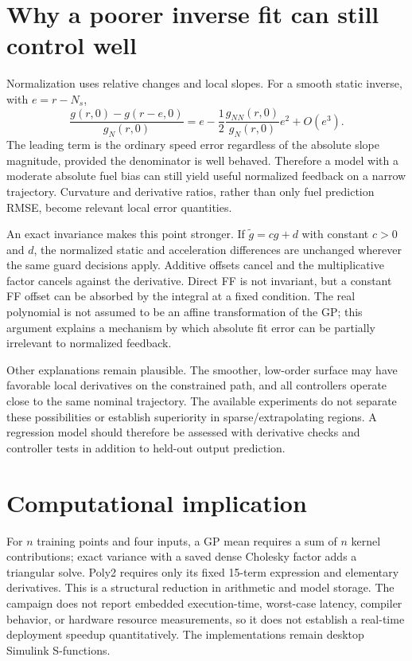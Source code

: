 \documentclass[11pt,a4paper,oneside]{report}
\begin{document}
\section{Why a poorer inverse fit can still control well}
Normalization uses relative changes and local slopes. For a smooth static inverse, with $e=r-N_s$,
\begin{equation}
\frac{g(r,0)-g(r-e,0)}{g_N(r,0)}
=e-\frac12\frac{g_{NN}(r,0)}{g_N(r,0)}e^2+O(e^3).
\end{equation}
The leading term is the ordinary speed error regardless of the absolute slope magnitude, provided the denominator is well behaved. Therefore a model with a moderate absolute fuel bias can still yield useful normalized feedback on a narrow trajectory. Curvature and derivative ratios, rather than only fuel prediction RMSE, become relevant local error quantities.

An exact invariance makes this point stronger. If $\tilde g=cg+d$ with constant $c>0$ and $d$, the normalized static and acceleration differences are unchanged wherever the same guard decisions apply. Additive offsets cancel and the multiplicative factor cancels against the derivative. Direct FF is not invariant, but a constant FF offset can be absorbed by the integral at a fixed condition. The real polynomial is not assumed to be an affine transformation of the GP; this argument explains a mechanism by which absolute fit error can be partially irrelevant to normalized feedback.

Other explanations remain plausible. The smoother, low-order surface may have favorable local derivatives on the constrained path, and all controllers operate close to the same nominal trajectory. The available experiments do not separate these possibilities or establish superiority in sparse/extrapolating regions. A regression model should therefore be assessed with derivative checks and controller tests in addition to held-out output prediction.

\section{Computational implication}
For $n$ training points and four inputs, a GP mean requires a sum of $n$ kernel contributions; exact variance with a saved dense Cholesky factor adds a triangular solve. Poly2 requires only its fixed 15-term expression and elementary derivatives. This is a structural reduction in arithmetic and model storage. The campaign does not report embedded execution-time, worst-case latency, compiler behavior, or hardware resource measurements, so it does not establish a real-time deployment speedup quantitatively. The implementations remain desktop Simulink S-functions.
\end{document}
